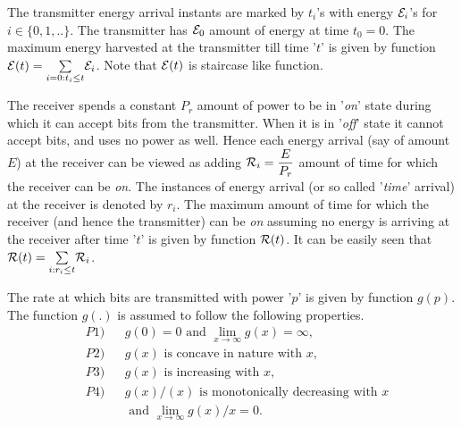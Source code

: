 The transmitter energy arrival instants are marked by $t_i$'s with energy $\mathcal{E}_i$'s for $i \in \{0,1,..\}$. The transmitter has $\mathcal{E}_0$ amount of energy at time $t_0=0$. The maximum energy harvested at the transmitter till time '$t$' is given by function $\mathcal{E}(t)=\underset{i=0:t_i\le t}{\sum}\mathcal{E}_i$. Note that $\mathcal{E}(t)$ is staircase like function.
 
The receiver spends a constant $P_{r}$ amount of power to be in '\textit{on}' state during which it can accept bits from the transmitter. When it is in '\textit{off}' state it cannot accept bits, and uses no power as well. Hence each energy arrival (say of amount $E$) at the receiver can be viewed as adding $\mathcal{R}_i=\dfrac{E}{P_{r}}$ amount of time for which the receiver can be \textit{on}. The instances of energy arrival (or so called '\textit{time}' arrival) at the receiver is denoted by $r_i$. The maximum amount of time for which the receiver (and hence the transmitter) can be \textit{on} assuming no energy is arriving at the receiver after time '$t$' is given by function $\mathcal{R}(t)$. It can be easily seen that $\mathcal{R}(t)=\underset{i:r_i\le t}{\sum}\mathcal{R}_i$.

The rate at which bits are transmitted with power '$p$' is given by function $g(p)$. The function $g(.)$ is assumed to follow the following properties. 
\begin{align}
&P1) &&g(0)=0\text{ and }\lim_{x\rightarrow \infty} g(x)= \infty,\label{property_0_infty}
\\
&P2) &&g(x)\text{ is concave in nature with } x,\label{property_concave}
\\
&P3) &&g(x)\text{ is increasing with } x,\label{property_increasing}
\\ 
&P4) &&g(x)/(x) \text{ is monotonically decreasing with } x\nonumber
\\
&    &&\text{ and } \lim_{x\rightarrow \infty} g(x)/x= 0.\label{property_decreasing}
\end{align}


